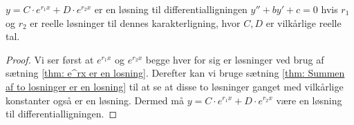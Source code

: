 \begin{thm}\label{thm: Den fuldstandige losning er en losning}
$y = C \cdot e^{r_1 x} + D \cdot e^{r_2 x}$ er en løsning til differentialligningen $y'' + by' + c = 0$ hvis $r_1$ og $r_2$ er reelle løsninger til dennes karakterligning, hvor $C,D$ er vilkårlige reelle tal.
\end{thm}
\begin{proof}
Vi ser først at $e^{r_1 x}$ og $e^{r_2 x}$ begge hver for sig er løsninger ved brug af sætning \ref{thm: e^rx er en losning}.
Derefter kan vi bruge sætning \ref{thm: Summen af to losninger er en losning} til at se at disse to løsninger ganget med vilkårlige konstanter også er en løsning.
Dermed må $y = C \cdot e^{r_1 x} + D \cdot e^{r_2 x}$ være en løsning til differentialligningen. 
\end{proof}

